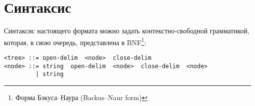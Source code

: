 \section{Синтаксис}
Синтаксис настоящего формата можно задать контекстно-свободной грамматикой, которая, в свою очередь, представлена в BNF\footnote{Форма Бэкуса--Наура (Backus--Naur form)}:
\begin{lstlisting}
<tree> ::= open-delim  <node>  close-delim
<node> ::= string  open-delim  <node>  close-delim  <node>
         | string
\end{lstlisting}
